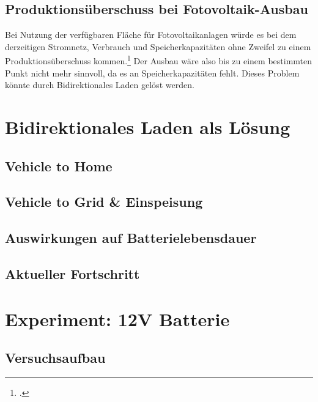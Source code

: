 \documentclass[12pt]{article}
\begin{document}
    \subsection{Produktionsüberschuss bei Fotovoltaik-Ausbau}
    Bei Nutzung der verfügbaren Fläche für Fotovoltaikanlagen würde es bei dem derzeitigen Stromnetz, Verbrauch und
    Speicherkapazitäten ohne Zweifel zu einem Produktionsüberschuss kommen.\footcite{wirthAktuelleFaktenZur}
    Der Ausbau wäre also bis zu einem bestimmten Punkt nicht mehr sinnvoll, da es an Speicherkapazitäten fehlt.
    Dieses Problem könnte durch Bidirektionales Laden gelöst werden.


    \section{Bidirektionales Laden als Lösung}

    \subsection{Vehicle to Home}

    \subsection{Vehicle to Grid \& Einspeisung}

    \subsection{Auswirkungen auf Batterielebensdauer}

    \subsection{Aktueller Fortschritt}


    \section{Experiment: 12V Batterie}

    \subsection{Versuchsaufbau}
\end{document}
